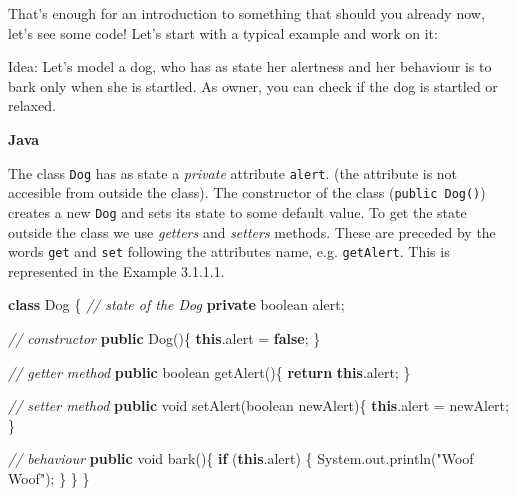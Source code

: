\documentclass[]{article}
\newenvironment{Shaded}{\begin{snugshade}}{\end{snugshade}}
\newcommand{\KeywordTok}[1]{\textcolor[rgb]{0.13,0.29,0.53}{\textbf{{#1}}}}
\newcommand{\DataTypeTok}[1]{\textcolor[rgb]{0.13,0.29,0.53}{{#1}}}
\newcommand{\StringTok}[1]{\textcolor[rgb]{0.31,0.60,0.02}{{#1}}}
\newcommand{\CommentTok}[1]{\textcolor[rgb]{0.56,0.35,0.01}{\textit{{#1}}}}
\newcommand{\FunctionTok}[1]{\textcolor[rgb]{0.00,0.00,0.00}{{#1}}}
\newcommand{\BuiltInTok}[1]{{#1}}
\newcommand{\NormalTok}[1]{{#1}}
\begin{document}
That's enough for an introduction to something that should you already
now, let's see some code! Let's start with a typical example and work on
it:

Idea: Let's model a dog, who has as state her alertness and her
behaviour is to bark only when she is startled. As owner, you can check
if the dog is startled or relaxed.

\textbf{Java}

The class \texttt{Dog} has as state a \emph{private} attribute
\texttt{alert}. (the attribute is not accesible from outside the class).
The constructor of the class (\texttt{public\ Dog()}) creates a new
\texttt{Dog} and sets its state to some default value. To get the state
outside the class we use \emph{getters} and \emph{setters} methods.
These are preceded by the words \texttt{get} and \texttt{set} following
the attributes name, e.g. \texttt{getAlert}. This is represented in the
Example 3.1.1.1.

\begin{Shaded}
\begin{Highlighting}[]
\KeywordTok{class} \NormalTok{Dog \{}
  \CommentTok{// state of the Dog}
  \KeywordTok{private} \DataTypeTok{boolean} \NormalTok{alert;}

  \CommentTok{// constructor}
  \KeywordTok{public} \FunctionTok{Dog}\NormalTok{()\{}
    \KeywordTok{this}\NormalTok{.}\FunctionTok{alert} \NormalTok{= }\KeywordTok{false}\NormalTok{;}
  \NormalTok{\}}

  \CommentTok{// getter method}
  \KeywordTok{public} \DataTypeTok{boolean} \FunctionTok{getAlert}\NormalTok{()\{}
    \KeywordTok{return} \KeywordTok{this}\NormalTok{.}\FunctionTok{alert}\NormalTok{;}
  \NormalTok{\}}

  \CommentTok{// setter method}
  \KeywordTok{public} \DataTypeTok{void} \FunctionTok{setAlert}\NormalTok{(}\DataTypeTok{boolean} \NormalTok{newAlert)\{}
    \KeywordTok{this}\NormalTok{.}\FunctionTok{alert} \NormalTok{= newAlert;}
  \NormalTok{\}}

  \CommentTok{// behaviour}
  \KeywordTok{public} \DataTypeTok{void} \FunctionTok{bark}\NormalTok{()\{}
    \KeywordTok{if} \NormalTok{(}\KeywordTok{this}\NormalTok{.}\FunctionTok{alert}\NormalTok{) \{}
      \BuiltInTok{System}\NormalTok{.}\FunctionTok{out}\NormalTok{.}\FunctionTok{println}\NormalTok{(}\StringTok{"Woof Woof"}\NormalTok{);}
    \NormalTok{\}}
  \NormalTok{\}}
\NormalTok{\}}
\end{Highlighting}
\end{Shaded}
\end{document}
